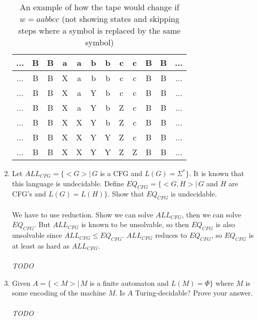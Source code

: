\documentclass[10pt,a4paper,final]{article}
\begin{document}
\begin{enumerate}
\begin{table}[h!]
\begin{center}
\begin{tabular}{|c|c|c|c|c|c|c|c|c|c|c|c|}
\hline
... & B & B & a & a & b & b & c & c & B & B & ... \\
\hline
... & B & B & X & a & b & b & c & c & B & B & ... \\
\hline
... & B & B & X & a & Y & b & c & c & B & B & ... \\
\hline
... & B & B & X & a & Y & b & Z & c & B & B & ... \\
\hline
... & B & B & X & X & Y & b & Z & c & B & B & ... \\
\hline
... & B & B & X & X & Y & Y & Z & c & B & B & ... \\
\hline
... & B & B & X & X & Y & Y & Z & Z & B & B & ... \\
\hline
\end{tabular}
\end{center}
\caption{An example of how the tape would change if $w = aabbcc$ (not showing states and skipping steps
where a symbol is replaced by the same symbol)}
\end{table}

\item %
Let $ALL_{CFG} = \{<G> |\, G$ is a CFG and $L(G) = \Sigma^*\}$.
It is known that this language is undecidable.
Define $EQ_{CFG} = \{<G,H> |\, G$ and $H$ are CFG's and $L(G) = L(H)\}$.
Show that $EQ_{CFG}$ is undecidable. \\
\\
We have to use reduction. Show we can solve $ALL_{CFG}$, then we can solve $EQ_{CFG}$.
But $ALL_{CFG}$ is known to be unsolvable, so then $EQ_{CFG}$ is also unsolvable since
$ALL_{CFG} \leq EQ_{CFG}$. $ALL_{CFG}$ reduces to $EQ_{CFG}$, so $EQ_{CFG}$ is at least as hard
as $ALL_{CFG}$. \\
\\
\emph{TODO}

\item %
Given $A = \{<M> |\, M$ is a finite automaton and $L(M) = \Phi\}$
where $M$ is some encoding of the machine $M$. Is $A$ Turing-decidable? Prove your answer. \\
\\
\emph{TODO}


\end{enumerate}
\end{document}
